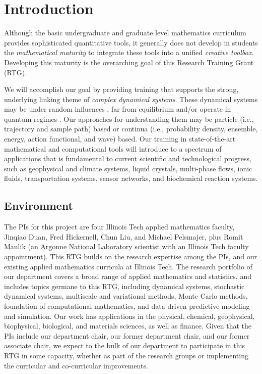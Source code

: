 \documentclass[11pt]{NSFamsart}
\begin{document}
  

\section{Introduction}

Although the basic undergraduate and graduate level mathematics curriculum provides sophisticated quantitative tools, it generally does not develop in students the \emph{mathematical maturity} to integrate these tools into a unified \emph{creative toolbox}. Developing this maturity is the overarching goal of this Research Training Grant (RTG).  

We will accomplish our goal by providing training that supports the strong, underlying linking theme of \emph{complex dynamical systems}.  These dynamical systems may be under random influences \cite{Arnold, DuanBook2015}, far from equilibrium \cite{liu2009introduction} and/or operate in quantum regimes \cite{Dittrich2016}. Our approaches for understanding them may be particle (i.e., trajectory and sample path) based or continua (i.e., probability density, ensemble, energy, action functional, and wave) based.  Our training in state-of-the-art mathematical and computational tools will introduce to a spectrum of applications that is fundamental to current scientific and technological progress, such as geophysical and climate systems, liquid crystals, multi-phase flows, ionic fluids,  transportation systems, sensor networks, and biochemical reaction systems. 

\subsection*{Environment} The PIs for this project are four Illinois Tech applied mathematics faculty,  Jinqiao Duan, Fred Hickernell, Chun Liu, and Michael Pelsmajer, plus Romit Maulik (an Argonne National Laboratory scientist with an Illinois Tech faculty appointment). This RTG builds on the research expertise among the PIs, and our existing applied mathematics curricula at Illinois Tech.  The research portfolio of our department covers a broad range of applied mathematics and statistics, and includes topics germane to this RTG, including dynamical systems, stochastic dynamical systems, multiscale and variational methods,  Monte Carlo methods, foundation of computational mathematics, and data-driven predictive modeling and simulation. Our work has applications in the physical, chemical, geophysical, biophysical, biological, and materials sciences, as well as finance.  Given that the PIs include our department chair, our former department chair, and our former associate chair, we expect to the bulk of our department to participate in this RTG in some capacity, whether as part of the research groups or implementing the curricular and co-curricular improvements.
\end{document}
